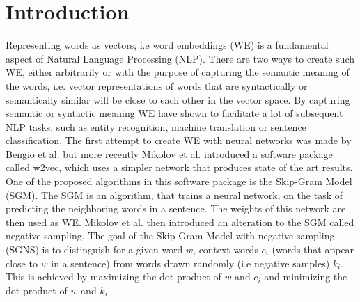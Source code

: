 \section{Introduction}\label{sec:introduction}

Representing words as vectors, i.e word embeddings (WE) is a fundamental aspect of Natural Language Processing (NLP). There are two ways to create such WE, either arbitrarily or with the purpose of capturing the semantic meaning of the words, i.e. vector representations of words that are syntactically or semantically similar will be close to each other in the vector space. By capturing semantic or syntactic meaning WE have shown to facilitate a lot of subsequent NLP tasks, such as entity recognition, machine translation or sentence classification. %
The first attempt to create WE with neural networks was made by Bengio et al. \cite{bengio} but more recently Mikolov et al. \cite{mikolov} introduced a software package called w2vec, which uses a simpler network that produces state of the art results. One of the proposed algorithms in this software package is the Skip-Gram Model (SGM). The SGM is an algorithm, that trains a neural network, on the task of predicting the neighboring words in a sentence. The weights of this network are then used as WE. Mikolov et al. \cite{mikolov2} then introduced an alteration to the SGM called negative sampling. The goal of the Skip-Gram Model with negative sampling (SGNS) is to distinguish for a given word $w$, context words $c_i$ (words that appear close to $w$ in a sentence) from words drawn randomly (i.e negative samples) $k_i$. This is achieved by maximizing the dot product of $w$ and $c_i$ and minimizing the dot product of $w$ and $k_i$.\\
